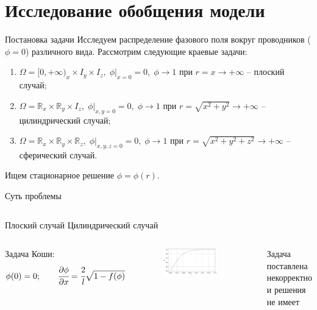 
\section{Исследование обобщения модели}

\begin{frame}{Постановка задачи}
Исследуем распределение фазового поля вокруг проводников ($\phi = 0$) различного вида. Рассмотрим
следующие краевые задачи:
\begin{enumerate}
	\item $\Omega = [0, +\infty)_x \times I_y \times I_z, \; \phi|_{x = 0} = 0, \; \phi \to 1$ при
	$r = x \to +\infty$ -- плоский случай;
	\item $\Omega = \mathbb{R}_x \times \mathbb{R}_y \times I_z, \; \phi|_{x, y = 0} = 0, \;
	\phi \to 1$ при $r = \sqrt{x^2 + y^2} \to +\infty$ -- \\ цилиндрический случай;
	\item $\Omega = \mathbb{R}_x \times \mathbb{R}_y \times \mathbb{R}_z, \;
	\phi|_{x, y, z = 0} = 0, \; \phi \to 1$ при $r = \sqrt{x^2 + y^2 + z^2} \to +\infty$ -- \\
	сферический случай.
\end{enumerate}
Ищем стационарное решение $\phi = \phi(r)$.
\end{frame}


\begin{frame}{Суть проблемы}
\begin{columns}
\centering
Плоский случай
\centering
Цилиндрический случай
\end{columns}
\vspace{0.5cm}
\begin{columns}
Задача Коши:
\vspace{-0.3cm}
$$\phi(0) = 0; \qquad \cfrac{\partial \phi}{\partial x} = \cfrac{2}{l} \sqrt{1 - f(\phi)}$$
\begin{figure}
	\includegraphics[width=\textwidth]{../figures/result_volumes.png}
\end{figure}
\rule{0.4pt}{0.7\textheight}
\centering
Задача поставлена некорректно \\ и решения не имеет \cite{zipunova_higher_codimension}
\end{columns}
\end{frame}


